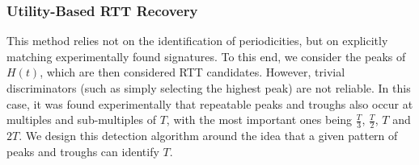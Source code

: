 
%
%


\subsubsection{Utility-Based RTT Recovery}
\label{sect:utilityBasedRecovery}

This method relies not on the identification of periodicities, but on explicitly matching experimentally found signatures. 
To this end, we consider the peaks of $H(t)$, which are then considered RTT candidates.  
However, trivial discriminators (such as simply selecting the highest peak) are not reliable. 
In this case, it was found experimentally that repeatable peaks and troughs also occur at multiples and sub-multiples of $T$, with the most important ones being $\frac{T}{3}$, $\frac{T}{2}$, $T$ and $2T$. 
We design this detection algorithm around the idea that a given pattern of peaks and troughs can identify $T$.

